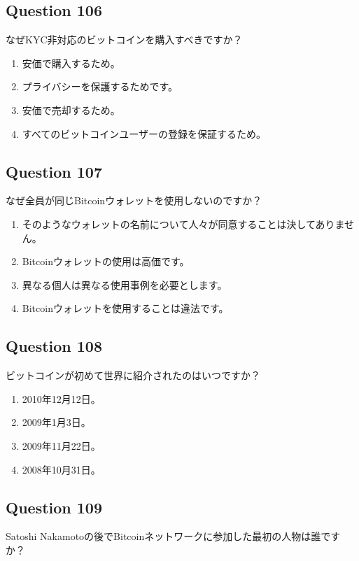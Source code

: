 \documentclass[12pt,a4paper]{article}
\begin{document}
\bigskip


\subsection*{Question 106}
なぜKYC非対応のビットコインを購入すべきですか？

\begin{enumerate}[label=\Alph*., leftmargin=*]
\item 安価で購入するため。
\item プライバシーを保護するためです。
\item 安価で売却するため。
\item すべてのビットコインユーザーの登録を保証するため。
\end{enumerate}

\bigskip


\subsection*{Question 107}
なぜ全員が同じBitcoinウォレットを使用しないのですか？

\begin{enumerate}[label=\Alph*., leftmargin=*]
\item そのようなウォレットの名前について人々が同意することは決してありません。
\item Bitcoinウォレットの使用は高価です。
\item 異なる個人は異なる使用事例を必要とします。
\item Bitcoinウォレットを使用することは違法です。
\end{enumerate}

\bigskip


\subsection*{Question 108}
ビットコインが初めて世界に紹介されたのはいつですか？

\begin{enumerate}[label=\Alph*., leftmargin=*]
\item 2010年12月12日。
\item 2009年1月3日。
\item 2009年11月22日。
\item 2008年10月31日。
\end{enumerate}

\bigskip


\subsection*{Question 109}
Satoshi Nakamotoの後でBitcoinネットワークに参加した最初の人物は誰ですか？
\end{document}
